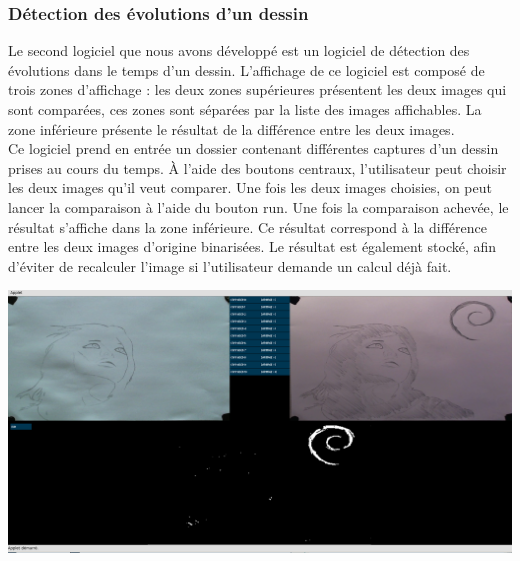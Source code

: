 \subsubsection{Détection des évolutions d'un dessin}

Le second logiciel que nous avons développé est un logiciel de détection des évolutions dans le temps d'un dessin. L'affichage de ce logiciel est composé de trois zones d'affichage : les deux zones supérieures présentent les deux images qui sont comparées, ces zones sont séparées par la liste des images affichables. La zone inférieure présente le résultat de la différence entre les deux images.\\

Ce logiciel prend en entrée un dossier contenant différentes captures d'un dessin prises au cours du temps. À l'aide des boutons centraux, l'utilisateur peut choisir les deux images qu'il veut comparer. Une fois les deux images choisies, on peut lancer la comparaison à l'aide du bouton run. Une fois la comparaison achevée, le résultat s'affiche dans la zone inférieure. Ce résultat correspond à la différence entre les deux images d'origine binarisées. Le résultat est également stocké, afin d'éviter de recalculer l'image si l'utilisateur demande un calcul déjà fait.\\

\begin{center}
\includegraphics[width=\textwidth]{images/evolution1.png}
\end{center}
